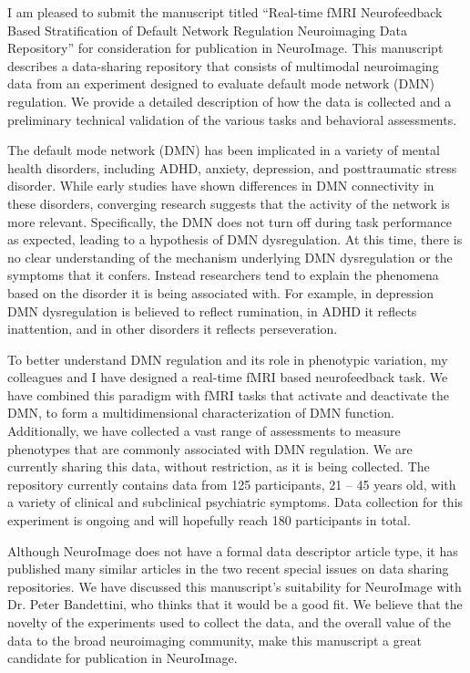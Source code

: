 \documentclass{article}
\begin{document}
\sffamily

I am pleased to submit the manuscript titled ``Real-time fMRI Neurofeedback Based Stratification of Default Network Regulation Neuroimaging Data Repository'' for consideration for publication in Neuro{I}mage. This manuscript describes a data-sharing repository that consists of multimodal neuroimaging data from an experiment designed to evaluate default mode network (DMN) regulation. We provide a detailed description of how the data is collected and a preliminary technical validation of the various tasks and behavioral assessments.

The default mode network (DMN) has been implicated in a variety of mental health disorders, including ADHD, anxiety, depression, and posttraumatic stress disorder. While early studies have shown differences in DMN connectivity in these disorders, converging research suggests that the activity of the network is more relevant. Specifically, the DMN does not turn off during task performance as expected, leading to a hypothesis of DMN dysregulation. At this time, there is no clear understanding of the mechanism underlying DMN dysregulation or the symptoms that it confers. Instead researchers tend to explain the phenomena based on the disorder it is being associated with. For example, in depression DMN dysregulation is believed to reflect rumination, in ADHD it reflects inattention, and in other disorders it reflects perseveration.

To better understand DMN regulation and its role in phenotypic variation, my colleagues and I have designed a real-time fMRI based neurofeedback task. We have combined this paradigm with fMRI tasks that activate and deactivate the DMN, to form a multidimensional characterization of DMN function. Additionally, we have collected a vast range of assessments to measure phenotypes that are commonly associated with DMN regulation. We are currently sharing this data, without restriction, as it is being collected. The repository currently contains data from 125 participants, 21 – 45 years old, with a variety of clinical and subclinical psychiatric symptoms. Data collection for this experiment is ongoing and will hopefully reach 180 participants in total.

Although Neuro{I}mage does not have a formal data descriptor article type, it has published many similar articles in the two recent special issues on data sharing repositories. We have discussed this manuscript’s suitability for Neuro{I}mage with Dr. Peter Bandettini, who thinks that it would be a good fit. We believe that the novelty of the experiments used to collect the data, and the overall value of the data to the broad neuroimaging community, make this manuscript a great candidate for publication in Neuro{I}mage.
\end{document}
